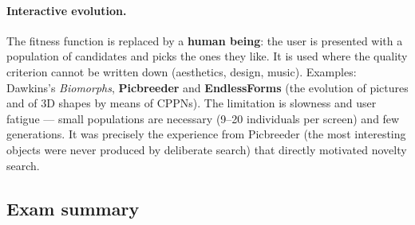\documentclass[11pt,a4paper]{article}
\theoremstyle{definition}
\begin{document}
\paragraph{Interactive evolution.} The fitness function is replaced by a \textbf{human
being}: the user is presented with a population of candidates and picks the ones they like.
It is used where the quality criterion cannot be written down (aesthetics, design, music).
Examples: Dawkins's \emph{Biomorphs}, \textbf{Picbreeder} and \textbf{EndlessForms} (the
evolution of pictures and of 3D shapes by means of CPPNs). The limitation is slowness and
user fatigue --- small populations are necessary (9--20 individuals per screen) and few
generations. It was precisely the experience from Picbreeder (the most interesting objects
were never produced by deliberate search) that directly motivated novelty search.

\subsection{Exam summary}
\end{document}
